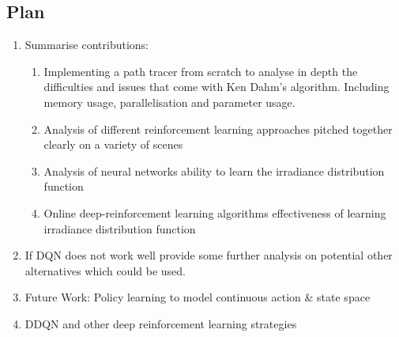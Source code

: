 \documentclass[ %
                    author={Callum Pearce},
                supervisor={Dr. Neill Campbell},
                    degree={MEng},
                     title={How effective are Temporal difference learning methods for reducing the number of zero contribution light paths while still accurately approximating Global Illumination in Path tracing?},
                  subtitle={},
                      type={research},
                      year={2019} ]{dissertation}
\begin{document}
\subsection{Plan}
\begin{enumerate}
\item Summarise contributions:

\begin{enumerate}
\item Implementing a path tracer from scratch to analyse in depth the difficulties and issues that come with Ken Dahm's algorithm. Including memory usage, parallelisation and parameter usage.

\item Analysis of different reinforcement learning approaches pitched together clearly on a variety of scenes

\item Analysis of neural networks ability to learn the irradiance distribution function

\item Online deep-reinforcement learning algorithms effectiveness of learning irradiance distribution function
\end{enumerate}

\item If DQN does not work well provide some further analysis on potential other alternatives which could be used.

\item Future Work: Policy learning to model continuous action \& state space

\item DDQN and other deep reinforcement learning strategies
\end{enumerate}


%
%
\end{document}
